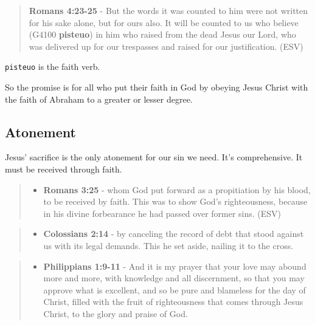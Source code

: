 \documentclass[11pt]{article}
\begin{document}
\begin{quote}
\textbf{Romans 4:23-25} - But the words it was counted to him were not written for his sake alone, but for ours also. It will be counted to us who believe (G4100 \textbf{pisteuo}) in him who raised from the dead Jesus our Lord, who was delivered up for our trespasses and raised for our justification. (ESV)
\end{quote}

\texttt{pisteuo} is the faith verb.

So the promise is for all who put their faith in God by obeying Jesus Christ with the faith of Abraham to a greater or lesser degree.

\subsection{Atonement}
\label{sec:orgf0243ab}
Jesus' sacrifice is the only atonement for our sin we need. It's comprehensive.
It must be received through faith.

\begin{quote}
\begin{itemize}
\item \textbf{Romans 3:25} -  whom God put forward as a propitiation by his blood, to be received by faith.  This was to show God's righteousness, because in his divine forbearance he had passed over former sins.  (ESV)
\end{itemize}
\end{quote}

\begin{quote}
\begin{itemize}
\item \textbf{Colossians 2:14} - by canceling the record of debt that stood against us with its legal demands. This he set aside, nailing it to the cross.
\end{itemize}
\end{quote}

\begin{quote}
\begin{itemize}
\item \textbf{Philippians 1:9-11} - And it is my prayer that your love may abound more and more, with knowledge and all discernment, so that you may approve what is excellent, and so be pure and blameless for the day of Christ, filled with the fruit of righteousness that comes through Jesus Christ, to the glory and praise of God.
\end{itemize}
\end{quote}
\end{document}
